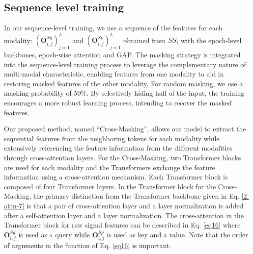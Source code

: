 
\subsection{Sequence level training}\label{3-2_sequence_level_training} %

In our sequence-level training, we use a sequence of the features for each modality: 
$(\textbf{O}^{Sg}_{i, j})_{j=1}^L$ and $(\textbf{O}^{Sp}_{i, j})_{j=1}^L$ obtained from $SS_i$ with the epoch-level backbones, epoch-wise attention and GAP.
%
The masking strategy is integrated into the sequence-level training process to leverage the complementary nature of multi-modal characteristic, %
enabling features from one modality
to aid in restoring masked features of the other modality.
%
For random masking, we use a masking probability of 50\%. By selectively hiding half of the input, the training encourages a more robust learning process, intending to recover the masked features.

Our proposed method, named ``Cross-Masking'', allows our model to extract the sequential features from the neighboring tokens for each modality %
while extensively referencing the feature information from the different modalities %
through cross-attention layers.
%
For the Cross-Masking, two Transformer blocks are used for each modality %
and the Transformers exchange the feature information using a cross-attention mechanism.
Each Transformer block is composed of four Transformer layers. In the Transformer block for the Cross-Masking, the primary distinction from the Transformer backbone given in Eq. \ref{2. attn-7} is that a pair of cross-attention layer and a layer normalization is added after a self-attention layer and a layer normalization. %
%
The cross-attention in the Transformer block for raw signal features can be described in Eq. \ref{eq16} where $\textbf{O}^{Sg}_{i, j}$ is used as a query while $\textbf{O}^{Sp}_{i, j}$ is used as key and a value. Note that the order of arguments in the function of Eq. \ref{eq16} is important.


